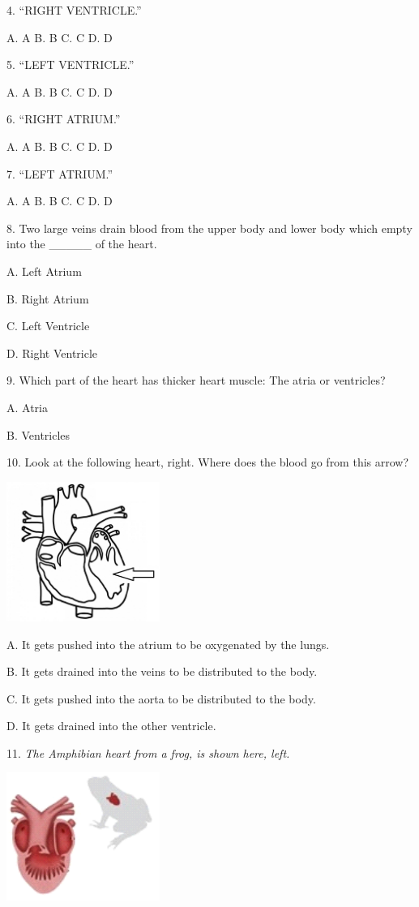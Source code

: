 \documentclass[11.5pt]{sig-alternate} %
\begin{document}
4. “RIGHT VENTRICLE.”

A. A B. B C. C D. D

5. “LEFT VENTRICLE.”

A. A B. B C. C D. D

6. “RIGHT ATRIUM.”

A. A B. B C. C D. D

7. “LEFT ATRIUM.”

A. A B. B C. C D. D

8. Two large veins drain blood from the upper body and lower body which empty into the \_\_\_\_\_ of the heart.

A. Left Atrium

B. Right Atrium

C. Left Ventricle

D. Right Ventricle

9. Which part of the heart has thicker heart muscle: The atria or ventricles?

A. Atria

B. Ventricles

10. Look at the following heart, right. Where does the blood go from this arrow?

\includegraphics[width=5cm]{quiz/heart10.jpg}

A. It gets pushed into the atrium to be oxygenated by the lungs.

B. It gets drained into the veins to be distributed to the body.

C. It gets pushed into the aorta to be distributed to the body.

D. It gets drained into the other ventricle.

11. \textit{The Amphibian heart from a frog, is shown here, left.}

\includegraphics[width=5cm]{quiz/frog.png}
\end{document}

